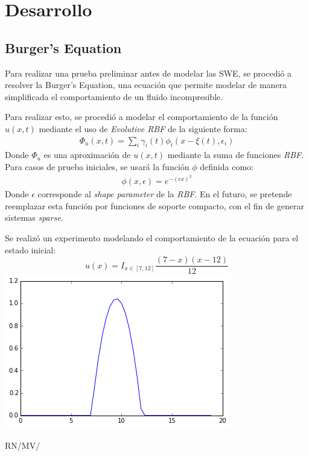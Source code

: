 \documentclass[spanish, fleqn]{article}
\begin{document}
\section{Desarrollo}
  \subsection{Burger's Equation}
    Para realizar una prueba preliminar antes de modelar las SWE, se procedió a resolver la Burger's Equation, una ecuación que 
    permite modelar de manera simplificada el comportamiento de un fluido incompresible.
    
    Para realizar esto, se procedió a modelar el comportamiento de la función $u(x,t)$ mediante el uso de 
    \textit{Evolutive RBF} de la siguiente forma:
    \begin{align*}
      \Phi_u(x,t) = \sum_i \gamma_i(t)\phi_i(x-\xi(t),\epsilon_i)
    \end{align*}
    Donde $\Phi_u$ es una aproximación de $u(x,t)$ mediante la suma de funciones \textit{RBF}. Para casos de prueba iniciales, 
    se usará la función $\phi$ definida como:
    \begin{align*}
      \phi(x,\epsilon) = e^{-(\epsilon x)^2}
    \end{align*}
    Donde $\epsilon$ corresponde al \textit{shape parameter} de la \textit{RBF}. En el futuro, se pretende reemplazar esta
    función por funciones de soporte compacto, con el fin de generar sistemas \textit{sparse}.
    
    Se realizó un experimento modelando el comportamiento de la ecuación para el estado inicial:
    \begin{equation*}
      u(x) = I_{x \in [7,12]}\frac{(7-x)(x-12)}{12}
    \end{equation*}
    \includegraphics[scale=0.6]{initialu.png}


\vfill\hfill RN/MV/\LaTeXe
\end{document}
